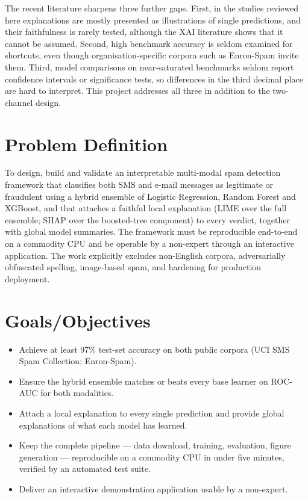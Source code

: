 \documentclass[12pt,a4paper]{report}
\begin{document}
The recent literature sharpens three further gaps. First, in the studies
reviewed here explanations are mostly presented as illustrations of single
predictions, and their faithfulness is rarely tested, although the XAI
literature shows that it cannot be assumed. Second, high benchmark accuracy is
seldom examined for shortcuts, even though organisation-specific corpora such
as Enron-Spam invite them. Third, model comparisons on near-saturated
benchmarks seldom report confidence intervals or significance tests, so
differences in the third decimal place are hard to interpret. This project
addresses all three in addition to the two-channel design.

\section{Problem Definition}

To design, build and validate an interpretable multi-modal spam detection
framework that classifies both SMS and e-mail messages as legitimate or
fraudulent using a hybrid ensemble of Logistic Regression, Random Forest and
XGBoost, and that attaches a faithful local explanation (LIME over the full
ensemble; SHAP over the boosted-tree component) to every verdict, together
with global model summaries. The framework must be reproducible end-to-end on
a commodity CPU and be operable by a non-expert through an interactive
application. The work explicitly excludes non-English corpora, adversarially
obfuscated spelling, image-based spam, and hardening for production
deployment.

\section{Goals/Objectives}\label{sec:objectives}

\begin{itemize}
  \item Achieve at least 97\% test-set accuracy on both public corpora (UCI
        SMS Spam Collection; Enron-Spam).
  \item Ensure the hybrid ensemble matches or beats every base learner on
        ROC-AUC for both modalities.
  \item Attach a local explanation to every single prediction and provide
        global explanations of what each model has learned.
  \item Keep the complete pipeline --- data download, training, evaluation,
        figure generation --- reproducible on a commodity CPU in under five
        minutes, verified by an automated test suite.
  \item Deliver an interactive demonstration application usable by a
        non-expert.
\end{itemize}
\end{document}
